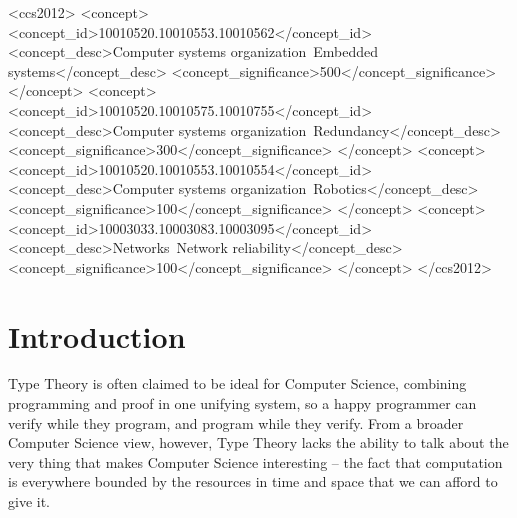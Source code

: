 \documentclass[acmsmall,screen]{acmart}
\begin{document}
\begin{CCSXML}
<ccs2012>
 <concept>
  <concept_id>10010520.10010553.10010562</concept_id>
  <concept_desc>Computer systems organization~Embedded systems</concept_desc>
  <concept_significance>500</concept_significance>
 </concept>
 <concept>
  <concept_id>10010520.10010575.10010755</concept_id>
  <concept_desc>Computer systems organization~Redundancy</concept_desc>
  <concept_significance>300</concept_significance>
 </concept>
 <concept>
  <concept_id>10010520.10010553.10010554</concept_id>
  <concept_desc>Computer systems organization~Robotics</concept_desc>
  <concept_significance>100</concept_significance>
 </concept>
 <concept>
  <concept_id>10003033.10003083.10003095</concept_id>
  <concept_desc>Networks~Network reliability</concept_desc>
  <concept_significance>100</concept_significance>
 </concept>
</ccs2012>
\end{CCSXML}




\maketitle

\section{Introduction}
\label{sec:introduction}

Type Theory is often claimed to be ideal for Computer Science,
combining programming and proof in one unifying system, so a happy
programmer can verify while they program, and program while they
verify. From a broader Computer Science view, however, Type Theory
lacks the ability to talk about the very thing that makes Computer
Science interesting -- the fact that computation is everywhere bounded
by the resources in time and space that we can afford to give it.
\end{document}
